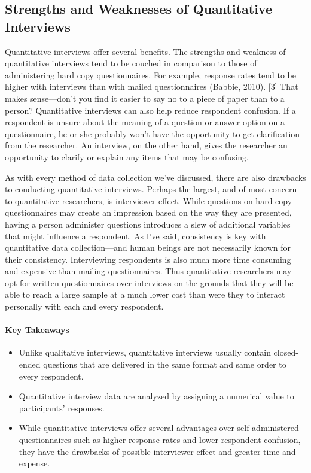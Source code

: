 \subsection{Strengths and Weaknesses of Quantitative Interviews}

Quantitative interviews offer several benefits. The strengths and weakness of quantitative interviews tend to be couched in comparison to those of administering hard copy questionnaires. For example, response rates tend to be higher with interviews than with mailed questionnaires (Babbie, 2010). [3] That makes sense—don’t you find it easier to say no to a piece of paper than to a person? Quantitative interviews can also help reduce respondent confusion. If a respondent is unsure about the meaning of a question or answer option on a questionnaire, he or she probably won’t have the opportunity to get clarification from the researcher. An interview, on the other hand, gives the researcher an opportunity to clarify or explain any items that may be confusing.

As with every method of data collection we’ve discussed, there are also drawbacks to conducting quantitative interviews. Perhaps the largest, and of most concern to quantitative researchers, is interviewer effect. While questions on hard copy questionnaires may create an impression based on the way they are presented, having a person administer questions introduces a slew of additional variables that might influence a respondent. As I’ve said, consistency is key with quantitative data collection—and human beings are not necessarily known for their consistency. Interviewing respondents is also much more time consuming and expensive than mailing questionnaires. Thus quantitative researchers may opt for written questionnaires over interviews on the grounds that they will be able to reach a large sample at a much lower cost than were they to interact personally with each and every respondent.

\paragraph{Key Takeaways}

\begin{itemize}
	\setlength{\itemsep}{0pt}
	\setlength{\parskip}{0pt}
	\setlength{\parsep}{0pt}
	
	\item Unlike qualitative interviews, quantitative interviews usually contain closed-ended questions that are delivered in the same format and same order to every respondent.
	\item Quantitative interview data are analyzed by assigning a numerical value to participants’ responses.
	\item While quantitative interviews offer several advantages over self-administered questionnaires such as higher response rates and lower respondent confusion, they have the drawbacks of possible interviewer effect and greater time and expense.
	
\end{itemize}


